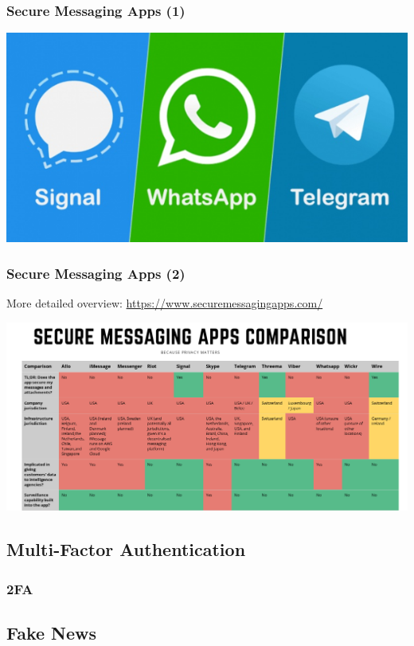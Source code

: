 \documentclass[aspectratio=169,dvipsnames]{beamer}
\begin{document}
\begin{frame}
\frametitle{Secure Messaging Apps (1)}
\begin{center}
\includegraphics[scale=0.5]{images/signal_whatsapp_telegram.png} 
\end{center}
\end{frame}

\begin{frame}
\frametitle{Secure Messaging Apps (2)}
\begin{center}
More detailed overview: \url{https://www.securemessagingapps.com/}
\bigskip

\includegraphics[scale=0.25, keepaspectratio]{images/secure_messengers_comparison.png} 
\end{center}
\end{frame}

\subsection{Multi-Factor Authentication}

\begin{frame}
\frametitle{2FA}
\end{frame}

\subsection{Fake News}
\end{document}

